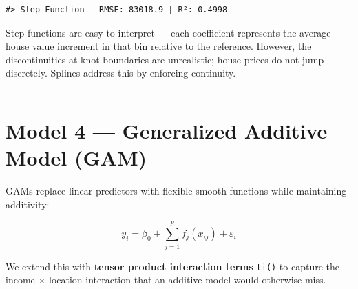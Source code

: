 \documentclass[
]{article}
\newenvironment{Shaded}{\begin{snugshade}}{\end{snugshade}}
\newcommand{\AttributeTok}[1]{\textcolor[rgb]{0.13,0.29,0.53}{#1}}
\newcommand{\FunctionTok}[1]{\textcolor[rgb]{0.13,0.29,0.53}{\textbf{#1}}}
\newcommand{\NormalTok}[1]{#1}
\newcommand{\OtherTok}[1]{\textcolor[rgb]{0.56,0.35,0.01}{#1}}
\newcommand{\SpecialCharTok}[1]{\textcolor[rgb]{0.81,0.36,0.00}{\textbf{#1}}}
\newcommand{\StringTok}[1]{\textcolor[rgb]{0.31,0.60,0.02}{#1}}
\begin{document}
\begin{Shaded}
\end{Shaded}

\begin{verbatim}
#> Step Function — RMSE: 83018.9 | R²: 0.4998
\end{verbatim}

Step functions are easy to interpret --- each coefficient represents the
average house value increment in that bin relative to the reference.
However, the discontinuities at knot boundaries are unrealistic; house
prices do not jump discretely. Splines address this by enforcing
continuity.

\begin{center}\rule{0.5\linewidth}{0.5pt}\end{center}

\section{Model 4 --- Generalized Additive Model (GAM)}\label{gam}

GAMs replace linear predictors with flexible smooth functions while
maintaining additivity:

\[y_i = \beta_0 + \sum_{j=1}^{p} f_j(x_{ij}) + \varepsilon_i\]

We extend this with \textbf{tensor product interaction terms}
\texttt{ti()} to capture the income × location interaction that an
additive model would otherwise miss.
\end{document}
